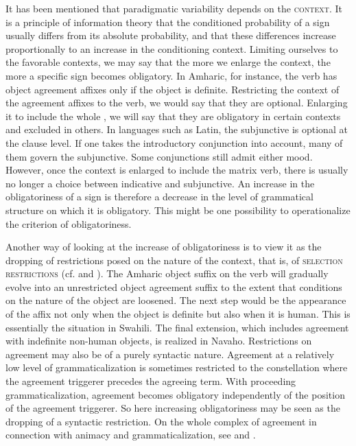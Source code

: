 It has been mentioned that paradigmatic variability depends on the \textsc{context}. It is a principle of information theory that the conditioned probability of a sign usually differs from its absolute probability, and that these differences increase proportionally to an increase in the conditioning context. Limiting ourselves to the favorable contexts, we may say that the more we enlarge the context, the more a specific sign becomes obligatory. In Amharic, for instance, the verb has object agreement affixes only if the object is definite. Restricting the context of the agreement affixes to the verb, we would say that they are optional. Enlarging it to include the whole \vp, we will say that they are obligatory in certain contexts and excluded in others. In languages such as Latin, the subjunctive is optional at the clause level. If one takes the introductory conjunction into account, many of them govern the subjunctive. Some conjunctions still admit either mood. However, once the context is enlarged to include the matrix verb, there is usually no longer a choice between indicative and subjunctive. An increase in the obligatoriness of a sign is therefore a decrease in the level of grammatical structure on which it is obligatory. This might be one possibility to operationalize the criterion of obligatoriness.

Another way of looking at the increase of obligatoriness is to view it as the dropping of restrictions posed on the nature of the context, that is, of \textsc{selection restrictions} (cf. \citealt[56]{Vincent1980a} and \citealt[99f]{Serzisko1981}). The Amharic object suffix on the verb will gradually evolve into an unrestricted object agreement suffix to the extent that conditions on the nature of the object are loosened. The next step would be the appearance of the affix not only when the object is definite but also when it is human. This is essentially the situation in Swahili. The final extension, which includes agreement with indefinite non-human objects, is realized in Navaho. Restrictions on agreement may also be of a purely syntactic nature. Agreement at a relatively low level of grammaticalization is sometimes restricted to the constellation where the agreement triggerer precedes the agreeing term. With proceeding grammaticalization, agreement becomes obligatory independently of the position of the agreement triggerer. So here increasing obligatoriness may be seen as the dropping of a syntactic restriction. On the whole complex of agreement in connection with animacy and grammaticalization, see \citet[184f]{Comrie1981b} and \citet[§6.2]{Lehmann1982b}.

